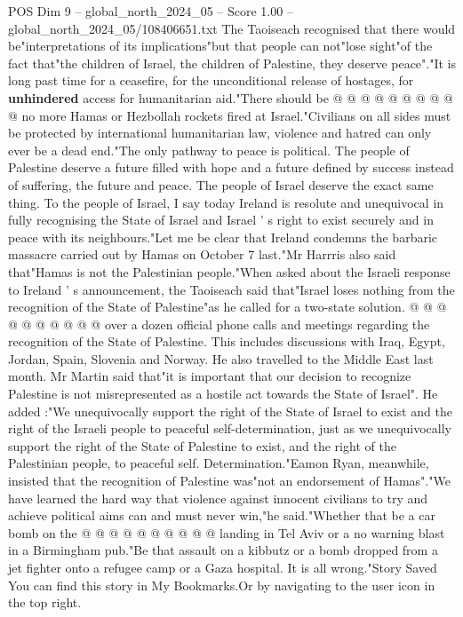 \begin{textsample}{POS Dim 9 – global\_north\_2024\_05 – Score 1.00 – global\_north\_2024\_05/108406651.txt}
The Taoiseach recognised that there would be"interpretations of its implications"but that people can not"lose sight"of the fact that"the children of Israel, the children of Palestine, they deserve peace"."It is long past time for a ceasefire, for the unconditional release of hostages, for \textbf{unhindered} access for humanitarian aid."There should be @ @ @ @ @ @ @ @ @ @ no more Hamas or Hezbollah rockets fired at Israel."Civilians on all sides must be protected by international humanitarian law, violence and hatred can only ever be a dead end."The only pathway to peace is political.
The people of Palestine deserve a future filled with hope and a future defined by success instead of suffering, the future and peace.
The people of Israel deserve the exact same thing.
To the people of Israel, I say today Ireland is resolute and unequivocal in fully recognising the State of Israel and Israel ' s right to exist securely and in peace with its neighbours."Let me be clear that Ireland condemns the barbaric massacre carried out by Hamas on October 7 last."Mr Harrris also said that"Hamas is not the Palestinian people."When asked about the Israeli response to Ireland ' s announcement, the Taoiseach said that"Israel loses nothing from the recognition of the State of Palestine"as he called for a two-state solution. @ @ @ @ @ @ @ @ @ @ over a dozen official phone calls and meetings regarding the recognition of the State of Palestine.
This includes discussions with Iraq, Egypt, Jordan, Spain, Slovenia and Norway.
He also travelled to the Middle East last month.
Mr Martin said that"it is important that our decision to recognize Palestine is not misrepresented as a hostile act towards the State of Israel".
He added :"We unequivocally support the right of the State of Israel to exist and the right of the Israeli people to peaceful self-determination, just as we unequivocally support the right of the State of Palestine to exist, and the right of the Palestinian people, to peaceful self.
Determination."Eamon Ryan, meanwhile, insisted that the recognition of Palestine was"not an endorsement of Hamas"."We have learned the hard way that violence against innocent civilians to try and achieve political aims can and must never win,"he said."Whether that be a car bomb on the @ @ @ @ @ @ @ @ @ @ landing in Tel Aviv or a no warning blast in a Birmingham pub."Be that assault on a kibbutz or a bomb dropped from a jet fighter onto a refugee camp or a Gaza hospital.
It is all wrong."Story Saved You can find this story in My Bookmarks.Or by navigating to the user icon in the top right.

\end{textsample}
